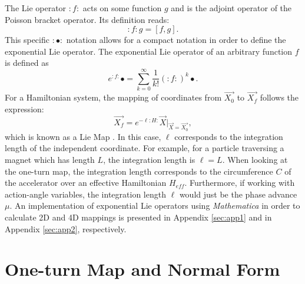 The Lie operator $:f:$ acts on some function $g$ and is the adjoint operator of the Poisson bracket operator. Its definition reads:
\begin{equation}
    \label{eq:ch2lie1}
    :f:g = \left[ f,g \right].
\end{equation}
This specific $:\bullet:$ notation allows for a compact notation in order to define the exponential Lie operator. The exponential Lie operator of an arbitrary function $f$ is defined as
\begin{equation}
    \label{eq:ch2explie1}
    e^{:f:}\bullet = \sum_{k=0}^{\infty}\frac{1}{k!}\left( :f: \right)^k \bullet.
\end{equation}
For a Hamiltonian system, the mapping of coordinates from $\vec{X_0}$ to $\vec{X_f}$ follows the expression:
\begin{equation}
    \label{eq:ch2liemap1}
    \vec{X_f}=e^{-\ell :H:}\vec{X}\bigg\rvert_{\vec{X}=\vec{X_0}},
\end{equation}
which is known as a Lie Map \cite{todd1}. In this case, $\ell$ corresponds to the integration length of the independent coordinate. For example, for a particle traversing a magnet which has length $L$, the integration length is $\ell = L$. When looking at the one-turn map, the integration length corresponds to the circumference $C$ of the accelerator over an effective Hamiltonian $H_{eff}$. Furthermore, if working with action-angle variables, the integration length $\ell$ would just be the phase advance $\mu$. An implementation of exponential Lie operators using \textit{Mathematica} \cite{mathematica} in order to calculate 2D and 4D mappings is presented in Appendix \ref{sec:app1} and in Appendix \ref{sec:app2}, respectively.\\ 

\section{\label{sec:oneturn}One-turn Map and Normal Form}

